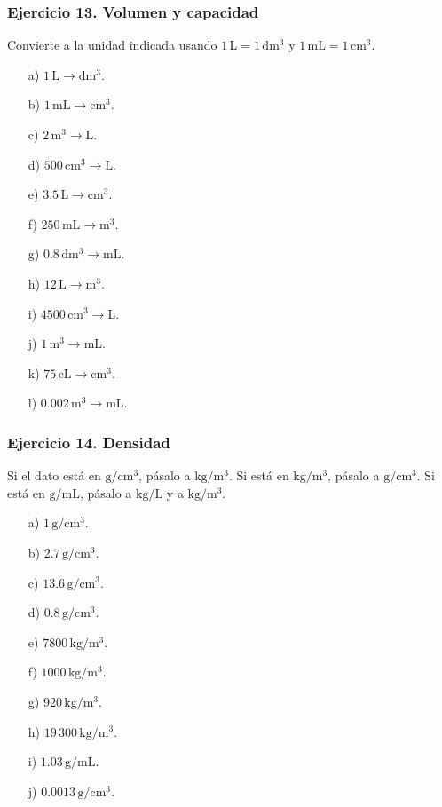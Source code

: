 \subsubsection*{Ejercicio 13. Volumen y capacidad}

Convierte a la unidad indicada usando
$1\,\mathrm{L}=1\,\mathrm{dm^3}$ y
$1\,\mathrm{mL}=1\,\mathrm{cm^3}$.

\begin{enumerate}
    \item[a)] $1\,\mathrm{L}\rightarrow\mathrm{dm^3}$.
    \item[b)] $1\,\mathrm{mL}\rightarrow\mathrm{cm^3}$.
    \item[c)] $2\,\mathrm{m^3}\rightarrow\mathrm{L}$.
    \item[d)] $500\,\mathrm{cm^3}\rightarrow\mathrm{L}$.
    \item[e)] $3.5\,\mathrm{L}\rightarrow\mathrm{cm^3}$.
    \item[f)] $250\,\mathrm{mL}\rightarrow\mathrm{m^3}$.
    \item[g)] $0.8\,\mathrm{dm^3}\rightarrow\mathrm{mL}$.
    \item[h)] $12\,\mathrm{L}\rightarrow\mathrm{m^3}$.
    \item[i)] $4500\,\mathrm{cm^3}\rightarrow\mathrm{L}$.
    \item[j)] $1\,\mathrm{m^3}\rightarrow\mathrm{mL}$.
    \item[k)] $75\,\mathrm{cL}\rightarrow\mathrm{cm^3}$.
    \item[l)] $0.002\,\mathrm{m^3}\rightarrow\mathrm{mL}$.
\end{enumerate}

\subsubsection*{Ejercicio 14. Densidad}

Si el dato está en $\mathrm{g/cm^3}$, pásalo a $\mathrm{kg/m^3}$.
Si está en $\mathrm{kg/m^3}$, pásalo a $\mathrm{g/cm^3}$.
Si está en $\mathrm{g/mL}$, pásalo a $\mathrm{kg/L}$ y a $\mathrm{kg/m^3}$.

\begin{enumerate}
    \item[a)] $1\,\mathrm{g/cm^3}$.
    \item[b)] $2.7\,\mathrm{g/cm^3}$.
    \item[c)] $13.6\,\mathrm{g/cm^3}$.
    \item[d)] $0.8\,\mathrm{g/cm^3}$.
    \item[e)] $7800\,\mathrm{kg/m^3}$.
    \item[f)] $1000\,\mathrm{kg/m^3}$.
    \item[g)] $920\,\mathrm{kg/m^3}$.
    \item[h)] $19\,300\,\mathrm{kg/m^3}$.
    \item[i)] $1.03\,\mathrm{g/mL}$.
    \item[j)] $0.0013\,\mathrm{g/cm^3}$.
\end{enumerate}

